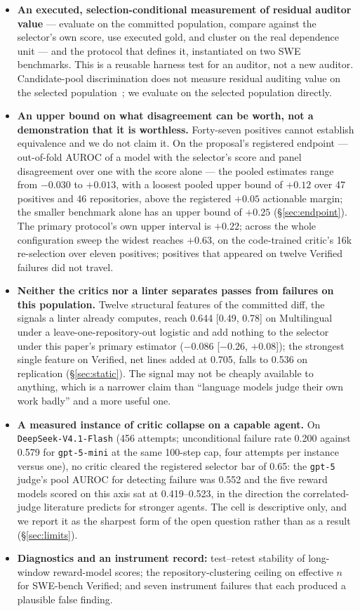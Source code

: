 \documentclass[11pt]{article}
\begin{document}
\begin{itemize}[leftmargin=1.2em,itemsep=1pt]
\item \textbf{An executed, selection-conditional measurement of residual auditor value} --- evaluate on the committed population, compare against the selector's own score, use executed gold, and cluster on the real dependence unit --- and the protocol that defines it, instantiated on two SWE benchmarks. This is a reusable harness test for an auditor, not a new auditor. Candidate-pool discrimination does not measure residual auditing value on the selected population~\citep{emadi2026scaling,trilemma2026}; we evaluate on the selected population directly.
\item \textbf{An upper bound on what disagreement can be worth, not a demonstration that it is worthless.} Forty-seven positives cannot establish equivalence and we do not claim it. On the proposal's registered endpoint --- out-of-fold AUROC of a model with the selector's score and panel disagreement over one with the score alone --- the pooled estimates range from $-0.030$ to $+0.013$, with a loosest pooled upper bound of $+0.12$ over 47 positives and 46 repositories, above the registered $+0.05$ actionable margin; the smaller benchmark alone has an upper bound of $+0.25$ (\S\ref{sec:endpoint}). The primary protocol's own upper interval is $+0.22$; across the whole configuration sweep the widest reaches $+0.63$, on the code-trained critic's 16k re-selection over eleven positives; positives that appeared on twelve Verified failures did not travel.
\item \textbf{Neither the critics nor a linter separates passes from failures on this population.} Twelve structural features of the committed diff, the signals a linter already computes, reach 0.644 [0.49, 0.78] on Multilingual under a leave-one-repository-out logistic and add nothing to the selector under this paper's primary estimator ($-0.086$ [$-0.26$, $+0.08$]); the strongest single feature on Verified, net lines added at 0.705, falls to 0.536 on replication (\S\ref{sec:static}). The signal may not be cheaply available to anything, which is a narrower claim than ``language models judge their own work badly'' and a more useful one.
\item \textbf{A measured instance of critic collapse on a capable agent.} On \texttt{DeepSeek-V4.1-Flash} (456 attempts; unconditional failure rate 0.200 against 0.579 for \texttt{gpt-5-mini} at the same 100-step cap, four attempts per instance versus one), no critic cleared the registered selector bar of 0.65: the \texttt{gpt-5} judge's pool AUROC for detecting failure was 0.552 and the five reward models scored on this axis sat at 0.419--0.523, in the direction the correlated-judge literature predicts for stronger agents. The cell is descriptive only, and we report it as the sharpest form of the open question rather than as a result (\S\ref{sec:limits}).
\item \textbf{Diagnostics and an instrument record:} test--retest stability of long-window reward-model scores; the repository-clustering ceiling on effective $n$ for SWE-bench Verified; and seven instrument failures that each produced a plausible false finding.
\end{itemize}
\end{document}

